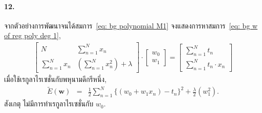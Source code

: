 \paragraph{12.} จากตัวอย่างการพัฒนาจนได้สมการ~\ref{eq: bg polynomial M1} 
จงแสดงการหาสมการ~\ref{eq: bg w of reg poly deg 1},
\begin{eqnarray}
%
\left[ 
\begin{matrix}
N & \sum_{n=1}^N x_n \\
\sum_{n=1}^N x_n & (\sum_{n=1}^N x_n^2) + \lambda
\end{matrix}
\right] \cdot 
\left[ 
\begin{matrix}
w_0 \\
w_1
\end{matrix}
\right]
=
\left[ 
\begin{matrix}
\sum_{n=1}^N t_n \\
\sum_{n=1}^N t_n \cdot x_n
\end{matrix}
\right]
\label{eq: bg w of reg poly deg 1}
\end{eqnarray}
เมื่อใช้เรกูลาไรเซชั่นกับพหุนามดีกรีหนึ่ง,
\begin{eqnarray}
   \tilde{E}(\mathbf{w}) &=& \frac{1}{2} \sum_{n=1}^N \{ (w_0 + w_1 x_n) - t_n \}^2 + \frac{\lambda}{2} (w_1^2).
\label{eq: bg regularized polynomial degree 1 E}
\end{eqnarray}
สังเกตุ ไม่มีการทำเรกูลาไรเซชั่นกับ $w_0$.

